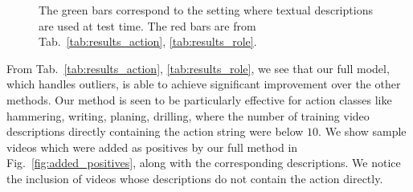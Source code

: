 \documentclass[10pt,twocolumn,letterpaper]{article}
\begin{document}
\addtolength{\subfigcapskip}{-0.1in}
\begin{figure}[ht!]
\centering
      \caption{The green bars correspond to the setting where textual descriptions are
      used at test time. The red bars
      are from Tab.~\ref{tab:results_action}, \ref{tab:results_role}.}
\label{fig:action_role_text}
\end{figure}

From Tab.~\ref{tab:results_action}, \ref{tab:results_role},
we see that our full model, which handles outliers, is able to achieve
significant improvement over the other methods.
Our method is seen to be particularly
effective for action classes like
hammering, writing, planing, drilling, where the number of training video
descriptions directly containing the action string were below $10$. We show
sample videos which were added as positives by our full method in
Fig.~\ref{fig:added_positives}, along with the corresponding descriptions. We
notice the inclusion of videos whose descriptions do not contain the action
directly. 
\end{document}

